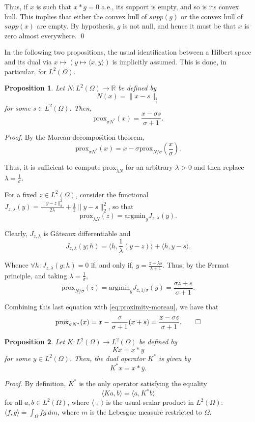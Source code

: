 \documentclass[twocolumn,twoside,a4paper,10pt]{IEEEtran}
\newtheorem{proposition}{Proposition}
\begin{document}
Thus, if \(x\) is such that \(x\ast g=0\) a.e., its support is empty, and so is its convex hull. This implies that either the convex hull of \(supp(g)\) or the convex hull of \(supp(x)\) are empty. By hypothesis, \(g\) is not null, and hence it must be that \(x\) is zero almost everywhere. \qed

In the following two propositions, the usual identification between a Hilbert space and its dual via \(x\mapsto(y\mapsto\langle x,y\rangle)\) is implicitly assumed. This is done, in particular, for \(L^2(\Omega)\).

\begin{proposition}\label{prop:proximity-square-norm}
  Let \(N\colon L^2(\Omega)\to \mathbb{R}\) be defined by
  \[
    N(x) = \|x-s\|_{_2^2}
  \]
  for some \(s\in L^2(\Omega)\). Then,
  \[
  \text{prox}_{\sigma N^*}(x) = \frac{x - \sigma s}{\sigma + 1}
  .\]

\end{proposition}
\textit{Proof.}
By the Moreau decomposition theorem,
\begin{equation}\label{eq:proximity-moreau}
  \text{prox}_{\sigma N^*}(x) = x - \sigma\text{prox}_{N/\sigma}\left(\frac x\sigma\right).
\end{equation}

Thus, it is sufficient to compute \(\text{prox}_{\lambda N}\) for an arbitrary \(\lambda > 0\) and then replace \(\lambda = \frac 1\sigma\).

For a fixed \(z\in L^2(\Omega)\), consider the functional \(J_{z, \lambda}(y) = \frac{\|y - z\|_{2}^2}{2\lambda} + \frac12 \|y - s\|_{2}^2\), so that
\[
  \text{prox}_{\lambda N}(z) = \text{argmin}_{y}J_{z, \lambda}(y)
.\]

Clearly, \(J_{z, \lambda}\) is Gâteaux differentiable and
\[
  J_{z, \lambda}(y; h) = \langle h, \frac 1\lambda(y-z)\rangle + \langle h, y-s\rangle
.\]

Whence \(\forall h\colon J_{z, \lambda}(y; h) = 0\) if, and only if, \(y=\frac{z + \lambda s}{\lambda + 1}\). Thus, by the Fermat principle, and taking \(\lambda = \frac 1\sigma\),
\[
  \text{prox}_{N / \sigma}(z) = \text{argmin}_{y}J_{z, 1/\sigma}(y) = \frac{\sigma z+ s}{\sigma + 1}
.\]

Combining this last equation with \cref{eq:proximity-moreau}, we have that
\[
  \text{prox}_{\sigma N^*}(x) = x -\frac{\sigma}{\sigma + 1}(x+s) = \frac{x - \sigma s}{\sigma + 1}
.\qed\]

\begin{proposition}\label{prop:proximity-convolution}
  Let \(K\colon L^2(\Omega)\to L^2(\Omega)\) be defined by
  \[
    Kx = x\ast y
  \]
  for some \(y\in L^2(\Omega)\). Then, the dual operator \(K^*\) is given by \[K^*x=x\ast\overline{y}.\]
\end{proposition}
\textit{Proof. } By definition, \(K^*\) is the only operator satisfying the equality
\[
  \langle Ka, b \rangle = \langle a, K^* b\rangle
\]
for all \(a, b\in L^2(\Omega)\), where \(\langle\cdot,\cdot\rangle\) is the usual scalar product in \(L^2(\Omega)\): \(\langle f, g\rangle = \int_{\Omega}fg~dm\), where \(m\) is the Lebesgue measure restricted to \(\Omega\).
\end{document}
